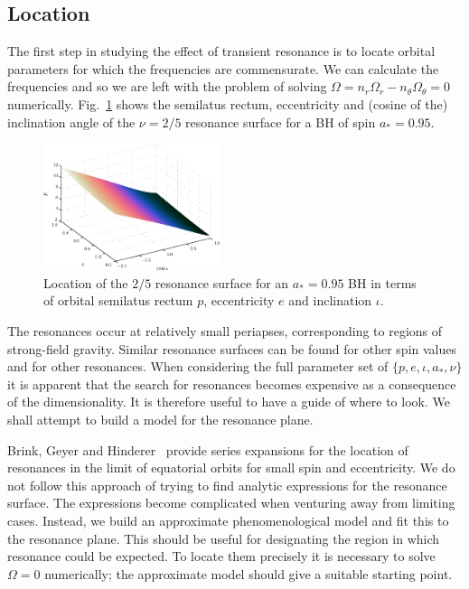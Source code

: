 \documentclass[aps,prd,amsfonts,amssymb,amsmath,nofootinbib,reprint,showpacs]{revtex4}
\newcommand{\Figref}[1]{Fig.\ \ref{fig:#1}}
\begin{document}
\subsection{Location}

The first step in studying the effect of transient resonance is to locate orbital parameters for which the frequencies are commensurate. We can calculate the frequencies and so we are left with the problem of solving $\Omega = n_r \Omega_r - n_\theta \Omega_\theta = 0$ numerically. \Figref{res-plane-2-5-95} shows the semilatus rectum, eccentricity and (cosine of the) inclination angle of the $\nu = 2/5$ resonance surface for a BH of spin $a_\ast = 0.95$. 
\begin{figure}[htbp]
\centering
\includegraphics[width=0.46\textwidth]{Fig_res-2-5-95-plane}
\caption{\label{fig:res-plane-2-5-95}Location of the $2/5$ resonance surface for an $a_\ast = 0.95$ BH in terms of orbital semilatus rectum $p$, eccentricity $e$ and inclination $\iota$.}
\end{figure}
The resonances occur at relatively small periapses, corresponding to regions of strong-field gravity.
Similar resonance surfaces can be found for other spin values and for other resonances. When considering the full parameter set of $\{p,e,\iota,a_\ast,\nu\}$ it is apparent that the search for resonances becomes expensive as a consequence of the dimensionality. It is therefore useful to have a guide of where to look. We shall attempt to build a model for the resonance plane.

Brink, Geyer and Hinderer~\cite{Brink2013} provide series expansions for the location of resonances in the limit of equatorial orbits for small spin and eccentricity. We do not follow this approach of trying to find analytic expressions for the resonance surface. The expressions become complicated when venturing away from limiting cases. Instead, we build an approximate phenomenological model and fit this to the resonance plane.%
This should be useful for designating the region in which resonance could be expected. To locate them precisely it is necessary to solve $\Omega = 0$ numerically; the approximate model should give a suitable starting point.
\end{document}

